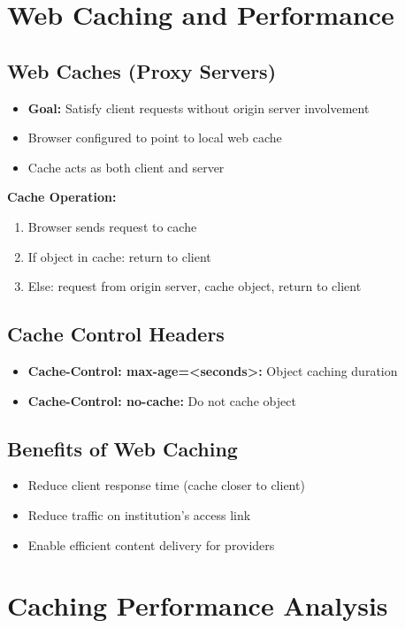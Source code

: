 \documentclass[12pt]{article}
\begin{document}
\section{Web Caching and Performance}

\subsection{Web Caches (Proxy Servers)}
\begin{itemize}
    \item \textbf{Goal:} Satisfy client requests without origin server involvement
    \item Browser configured to point to local web cache
    \item Cache acts as both client and server
\end{itemize}

\textbf{Cache Operation:}
\begin{enumerate}
    \item Browser sends request to cache
    \item If object in cache: return to client
    \item Else: request from origin server, cache object, return to client
\end{enumerate}

\subsection{Cache Control Headers}
\begin{itemize}
    \item \textbf{Cache-Control: max-age=<seconds>:} Object caching duration
    \item \textbf{Cache-Control: no-cache:} Do not cache object
\end{itemize}

\subsection{Benefits of Web Caching}
\begin{itemize}
    \item Reduce client response time (cache closer to client)
    \item Reduce traffic on institution's access link
    \item Enable efficient content delivery for providers
\end{itemize}

\section{Caching Performance Analysis}
\end{document}
